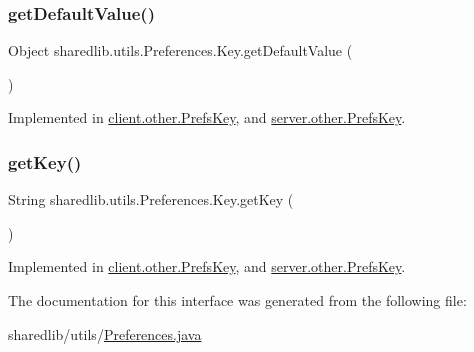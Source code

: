 \subsubsection{\texorpdfstring{get\+Default\+Value()}{getDefaultValue()}}
{\footnotesize\ttfamily Object sharedlib.\+utils.\+Preferences.\+Key.\+get\+Default\+Value (\begin{DoxyParamCaption}{ }\end{DoxyParamCaption})}



Implemented in \hyperlink{enumclient_1_1other_1_1_prefs_key_a7d50bec7ffef68ca2b9657cc4a8b271f}{client.\+other.\+Prefs\+Key}, and \hyperlink{enumserver_1_1other_1_1_prefs_key_a351b0589a30646eb7cd76560905cbc1a}{server.\+other.\+Prefs\+Key}.

\hypertarget{interfacesharedlib_1_1utils_1_1_preferences_1_1_key_a966e1acb44cc01f82c1b0d80c83d185d}{}\label{interfacesharedlib_1_1utils_1_1_preferences_1_1_key_a966e1acb44cc01f82c1b0d80c83d185d} 
\subsubsection{\texorpdfstring{get\+Key()}{getKey()}}
{\footnotesize\ttfamily String sharedlib.\+utils.\+Preferences.\+Key.\+get\+Key (\begin{DoxyParamCaption}{ }\end{DoxyParamCaption})}



Implemented in \hyperlink{enumclient_1_1other_1_1_prefs_key_a204beaf7ef2607c5ee052bf712d5fc66}{client.\+other.\+Prefs\+Key}, and \hyperlink{enumserver_1_1other_1_1_prefs_key_ad5cccedaf5ffa4e7cadbb08e025c2dbc}{server.\+other.\+Prefs\+Key}.



The documentation for this interface was generated from the following file\+:\begin{DoxyCompactItemize}
\item 
sharedlib/utils/\hyperlink{_preferences_8java}{Preferences.\+java}\end{DoxyCompactItemize}
